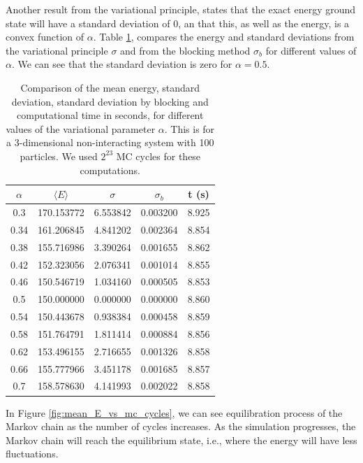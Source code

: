 \documentclass[aps,reprint,superscriptaddress,nofootinbib]{revtex4-2}
\begin{document}
    Another result from the variational principle, states that the exact energy ground state will have a standard deviation of 0, an that this, as well as the energy, is a convex function of \(\alpha\). Table \ref{tab:validation_table}, compares the energy and standard deviations from the variational principle \(\sigma\) and from the blocking method \(\sigma_b\) for different values of \(\alpha\). We can see that the standard deviation is zero for \(\alpha = 0.5\). 
    
    \begingroup
    \setlength{\tabcolsep}{8pt} %
    \renewcommand{\arraystretch}{1.25} %
    \begin{table}
        \caption{Comparison of the mean energy, standard deviation, standard deviation by blocking and computational time in seconds, for different values of the variational parameter \(\alpha\). This is for a 3-dimensional non-interacting system with 100 particles. We used \(2^{23}\) MC cycles for these computations.}
        \begin{tabular}{c||cccc}
            \(\alpha\) & \(\langle E \rangle\) & \(\sigma\) & \(\sigma_b\) & t (s) \\ \hline \hline
            0.3 & 170.153772 & 6.553842 & 0.003200 & 8.925 \\ 
            0.34 & 161.206845 & 4.841202 & 0.002364 & 8.854 \\
            0.38 & 155.716986 & 3.390264 & 0.001655 & 8.862 \\ 
            0.42 & 152.323056 & 2.076341 & 0.001014 & 8.855 \\ 
            0.46 & 150.546719 & 1.034160 & 0.000505 & 8.853 \\ 
            0.5 & 150.000000 & 0.000000 & 0.000000 & 8.860 \\ 
            0.54 & 150.443678 & 0.938384 & 0.000458 & 8.859 \\ 
            0.58 & 151.764791 & 1.811414 & 0.000884 & 8.856 \\ 
            0.62 & 153.496155 & 2.716655 & 0.001326 & 8.858 \\ 
            0.66 & 155.777966 & 3.451178 & 0.001685 & 8.857 \\ 
            0.7 & 158.578630 & 4.141993 & 0.002022 & 8.858 \\ 
        \end{tabular}
        \label{tab:validation_table}
    \end{table}
    \endgroup
    
    In Figure \ref{fig:mean_E_vs_mc_cycles}, we can see equilibration process of the Markov chain as the number of cycles increases. As the simulation progresses, the Markov chain will reach the equilibrium state, i.e., where the energy will have less fluctuations. 
    
\end{document}
